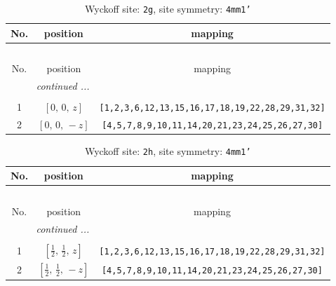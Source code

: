 \documentclass[fleqn,8pt]{jsarticle}
\begin{document}
\begin{longtable}{ccc}
\caption{Wyckoff site: {\tt 2g}, site symmetry: {\tt 4mm1'}}
 \\
 \hline \hline
No. & position & mapping \\ \hline \endfirsthead

\multicolumn{2}{l}{\tablename\ \thetable{}} \\
 \hline \hline
No. & position & mapping \\ \hline \endhead

 \hline \hline
\multicolumn{2}{r}{\footnotesize\it continued ...} \\ \endfoot

 \hline \hline
\multicolumn{2}{r}{} \\ \endlastfoot

1 & $\left[ 0,\, 0,\, z \right]$ & {\tt [1,2,3,6,12,13,15,16,17,18,19,22,28,29,31,32]} \\ \hline
2 & $\left[ 0,\, 0,\, - z \right]$ & {\tt [4,5,7,8,9,10,11,14,20,21,23,24,25,26,27,30]} \\
\end{longtable}
\renewcommand{\arraystretch}{1.2}
\begin{longtable}{ccc}
\caption{Wyckoff site: {\tt 2h}, site symmetry: {\tt 4mm1'}}
 \\
 \hline \hline
No. & position & mapping \\ \hline \endfirsthead

\multicolumn{2}{l}{\tablename\ \thetable{}} \\
 \hline \hline
No. & position & mapping \\ \hline \endhead

 \hline \hline
\multicolumn{2}{r}{\footnotesize\it continued ...} \\ \endfoot

 \hline \hline
\multicolumn{2}{r}{} \\ \endlastfoot

1 & $\left[ \frac{1}{2},\, \frac{1}{2},\, z \right]$ & {\tt [1,2,3,6,12,13,15,16,17,18,19,22,28,29,31,32]} \\ \hline
2 & $\left[ \frac{1}{2},\, \frac{1}{2},\, - z \right]$ & {\tt [4,5,7,8,9,10,11,14,20,21,23,24,25,26,27,30]} \\
\end{longtable}
\renewcommand{\arraystretch}{1.2}
\end{document}
